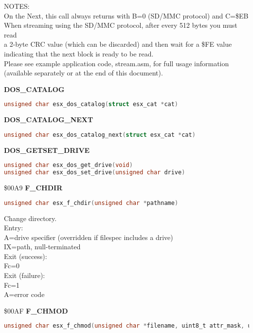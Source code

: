 NOTES:\\
On the Next, this call always returns with B=0 (SD/MMC protocol) and C=\$EB\\
When streaming using the SD/MMC protocol, after every 512 bytes you must read\\
a 2-byte CRC value (which can be discarded) and then wait for a \$FE value\\
indicating that the next block is ready to be read.\\
Please see example application code, stream.asm, for full usage information\\
(available separately or at the end of this document).

\textbf{DOS\_CATALOG}

\begin{lstlisting}[language=C]
unsigned char esx_dos_catalog(struct esx_cat *cat)
\end{lstlisting}

\textbf{DOS\_CATALOG\_NEXT}

\begin{lstlisting}[language=C]
unsigned char esx_dos_catalog_next(struct esx_cat *cat)
\end{lstlisting}

\textbf{DOS\_GETSET\_DRIVE}

\begin{lstlisting}[language=C]
unsigned char esx_dos_get_drive(void)
unsigned char esx_dos_set_drive(unsigned char drive)
\end{lstlisting}

\$00A9 \textbf{F\_CHDIR}

\begin{lstlisting}[language=C]
unsigned char esx_f_chdir(unsigned char *pathname)
\end{lstlisting}

Change directory.\\
Entry:\\
A=drive specifier (overridden if filespec includes a drive)\\
IX=path, null-terminated\\
Exit (success):\\
Fc=0\\
Exit (failure):\\
Fc=1\\
A=error code

\$00AF \textbf{F\_CHMOD}

\begin{lstlisting}[language=C]
unsigned char esx_f_chmod(unsigned char *filename, uint8_t attr_mask, uint8_t attr)
\end{lstlisting}


